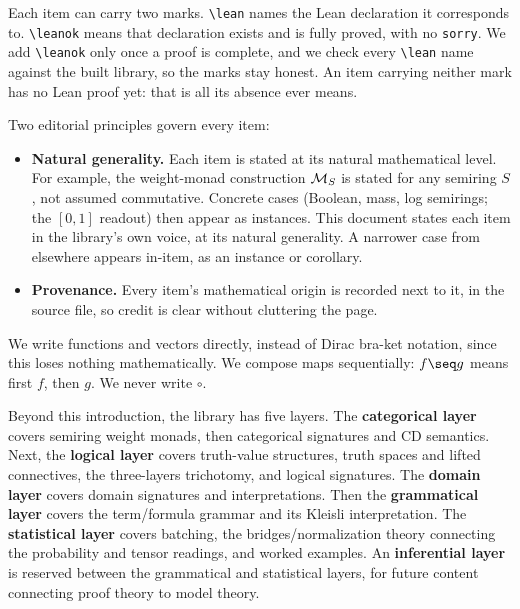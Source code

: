 Each item can carry two marks. \texttt{\textbackslash lean} names the
Lean declaration it corresponds to. \texttt{\textbackslash leanok}
means that declaration exists and is fully proved, with no
\texttt{sorry}. We add \texttt{\textbackslash leanok} only once a proof
is complete, and we check every \texttt{\textbackslash lean} name
against the built library, so the marks stay honest. An item carrying
neither mark has no Lean proof yet: that is all its absence ever means.

Two editorial principles govern every item:
\begin{itemize}
\item \textbf{Natural generality.} Each item is stated at its natural
  mathematical level. For example, the weight-monad construction
  $\mathcal M_{S}$ is stated for any semiring $S$, not assumed commutative.
  Concrete cases (Boolean, mass, log semirings; the $[0,1]$ readout)
  then appear as instances. This document states each item in the
  library's own voice, at its natural generality. A narrower case from
  elsewhere appears in-item, as an instance or corollary.
\item \textbf{Provenance.} Every item's mathematical origin is recorded
  next to it, in the source file, so credit is clear without cluttering
  the page.
\end{itemize}

We write functions and vectors directly, instead of Dirac bra-ket
notation, since this loses nothing mathematically. We compose maps
sequentially: $f \seq g$ means first $f$, then $g$. We never write
$\circ$.

Beyond this introduction, the library has five layers. The
\textbf{categorical layer} covers semiring weight monads, then
categorical signatures and CD semantics. Next, the \textbf{logical
layer} covers truth-value structures, truth spaces and lifted
connectives, the three-layers trichotomy, and logical signatures. The
\textbf{domain layer} covers domain signatures and interpretations.
Then the \textbf{grammatical layer} covers the term/formula grammar
and its Kleisli interpretation. The \textbf{statistical layer} covers
batching, the bridges/normalization theory connecting the probability
and tensor readings, and worked examples. An \textbf{inferential
layer} is reserved between the grammatical and statistical layers, for
future content connecting proof theory to model theory.


